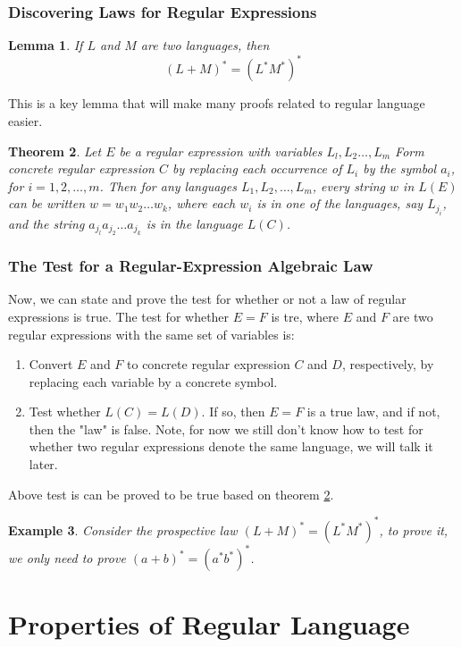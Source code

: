 \documentclass[12pt,reqno]{amsart}
\newtheorem{thm}{Theorem}[section]
\newtheorem{lem}[thm]{Lemma}
\newtheorem{example}[thm]{Example}
\begin{document}
\subsubsection{Discovering Laws for Regular Expressions}
\begin{lem}
	If $L$ and $M$ are two languages, then
	$$
		(L + M)^* = (L^*M^*)^*
	$$
\end{lem}
This is a key lemma that will make many proofs related to regular language easier.

\begin{thm}
	\label{replaceThm}
	Let $E$ be a regular expression with variables $L_l, L_2\ldots,L_m$ Form concrete regular expression $C$ by replacing each occurrence of $L_i$ by the symbol $a_i$, for $i = 1,2,\ldots,m$. Then for any languages $L_1, L_2,\ldots, L_m$, every string $w$ in $L(E)$ can be written $w=w_1w_2\ldots w_k$, where each $w_i$ is in one of
the languages, say $L_{j_i}$, and the string $a_{j_l}a_{j_2}\ldots a_{j_k}$ is in the language $L(C)$. 
\end{thm}


\subsubsection{The Test for a Regular-Expression Algebraic Law}
Now, we can state and prove the test for whether or not a law of regular expressions is true. The test for whether $E=F$ is tre, where $E$ and $F$ are two regular expressions with the same set of variables is:
\begin{enumerate}
	\item Convert $E$ and $F$ to concrete regular expression $C$ and $D$, respectively, by replacing each variable by a concrete symbol.
	\item Test whether $L(C) = L(D)$. If so, then $E=F$ is a true law, and if not, then the "law" is false. Note, for now we still don't know how to test for whether two regular expressions denote the same language, we will talk it later.
\end{enumerate}
Above test is can be proved to be true based on theorem \ref{replaceThm}.

\begin{example}
	Consider the prospective law $(L+M)^* = (L^*M^*)^*$, to prove it, we only need to prove $(a+b)^* = (a^*b^*)^*$.
\end{example}


\section{Properties of Regular Language}
\end{document}

